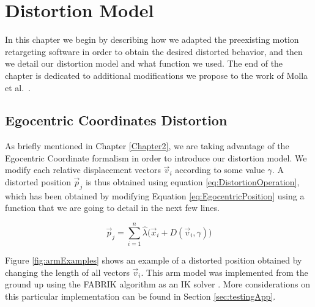 
\chapter{Distortion Model} %

\label{Chapter3} %

In this chapter we begin by describing how we adapted the preexisting motion retargeting software in order to obtain the desired distorted behavior, and then we detail our distortion model and what function we used. The end of the chapter is dedicated to additional modifications we propose to the work of Molla et al.\ \cite{molla2017egocentric}.

\section{Egocentric Coordinates Distortion}

As briefly mentioned in Chapter \ref{Chapter2}, we are taking advantage of the Egocentric Coordinate formalism in order to introduce our distortion model. We modify each relative displacement vectors $\vec{v}_i$ according to some value $\gamma$. A distorted position $\vec{p}_j$ is thus obtained using equation \ref{eq:DistortionOperation}, which has been obtained by modifying Equation \ref{eq:EgocentricPosition} using a function that we are going to detail in the next few lines.

\begin{equation}
\label{eq:DistortionOperation}
\vec{p}_j = \displaystyle\sum_{i=1}^{n} \hat{\lambda}\big(\vec{x}_i + D(\vec{v}_i,\gamma )\big)
\end{equation}

Figure \ref{fig:armExamples} shows an example of a distorted position obtained by changing the length of all vectors $\vec{v}_i$. This arm model was implemented from the ground up using the FABRIK algorithm as an IK solver \cite{aristidou2011fabrik}. More considerations on this particular implementation can be found in Section \ref{sec:testingApp}.

